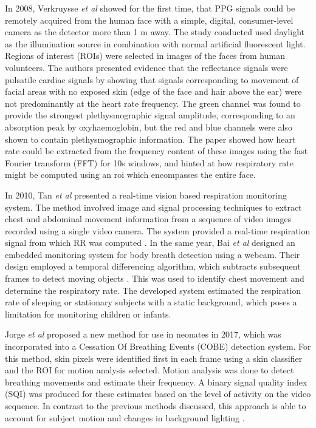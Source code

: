 In 2008,  Verkruysse \textit{et al }\cite{verkruysse2008remote} showed for the first time, that PPG signals could be remotely acquired from the human face with a simple, digital, consumer-level camera as the detector more than 1 m away. The study conducted used daylight as the illumination source in combination with normal artificial fluorescent light. Regions of interest (ROIs) were selected in images of the faces from human volunteers. 
The authors presented evidence that the reflectance signals were pulsatile cardiac signals by showing that signals corresponding to movement of facial areas with no exposed skin (edge of the face and hair above the ear) were not predominantly at the heart rate frequency. The green channel was found to provide the strongest plethysmographic signal amplitude, corresponding to an absorption peak by oxyhaemoglobin, but the red and blue channels were also shown to contain plethysmographic information. The paper showed how heart rate could be extracted from the frequency content of these images using the fast Fourier transform (FFT) for 10s windows, and hinted at how respiratory rate might be computed using an \gls{roi} which encompasses the entire face.

In 2010, Tan \textit{et al} presented a real-time vision based respiration monitoring system. The method involved image and signal processing techniques to extract chest and abdominal movement information from a sequence of video images recorded using a single video camera. The system provided a real-time respiration signal from which RR was computed \cite{tan2010real}. In the same year, Bai \textit{et al}\cite{bai2010design} designed an embedded monitoring system for body breath detection using a webcam. 
Their design employed a temporal differencing algorithm, which subtracts subsequent frames to detect moving objects \cite{lien2008monitoring}. This was used to identify chest movement and determine the respiratory rate. The developed system estimated the respiration rate of sleeping or stationary subjects with a static background, which poses a limitation for monitoring children or infants.

Jorge \textit{et al} proposed a new method for use in neonates in 2017, which was incorporated into a Cessation Of Breathing Events (COBE) detection system. For this method, skin pixels were identified first in each frame using a skin classifier and the ROI for motion analysis selected. Motion analysis was done to detect breathing movements and estimate their frequency. A binary signal quality index (SQI) was produced for these estimates based on the level of activity on the video sequence. In contrast to the previous methods discussed, this approach is able to account for subject motion and changes in background lighting \cite{jorge2017non}.

